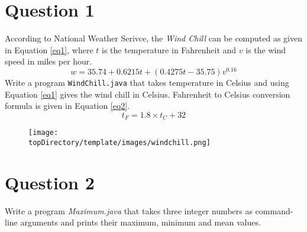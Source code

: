 \section*{Question 1}
According to National Weather Serivce, the \textit{Wind Chill} can be computed as given in Equation \ref{eq1}, where $t$ is the temperature in Fahrenheit and $v$ is the wind speed in miles per hour.
\begin{equation}
w = 35.74 + 0.6215 t + (0.4275t-35.75)v^{0.16}
\label{eq1}
\end{equation}
Write a program \texttt{WindChill.java} that takes temperature in Celsius and using Equation \ref{eq1} gives the wind chill in Celsius.
Fahrenheit to Celsius conversion formula is given in Equation \ref{eq2}.
\begin{equation}
t_F = 1.8 \times t_C + 32
\label{eq2}
\end{equation}
\begin{figure}[H]\centering
\texttt{[image: \\topDirectory/template/images/windchill.png]}
\end{figure}
\section*{Question 2}
Write a program \textit{Maximum.java} that takes three integer numbers as command-line arguments and prints their maximum, minimum and mean values.
